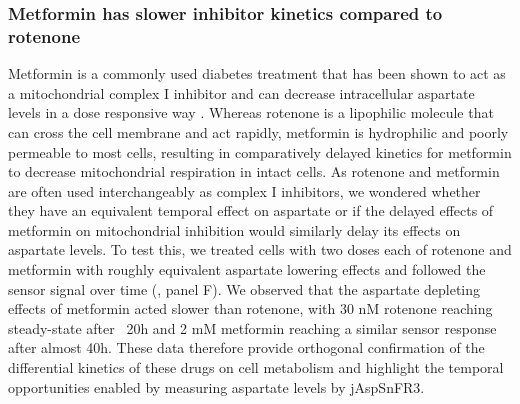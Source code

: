 \documentclass[9pt,lineno]{elife}
\begin{document}
\subsubsection{Metformin has slower inhibitor kinetics compared to rotenone}
Metformin is a commonly used diabetes treatment that has been shown to act as a mitochondrial complex I inhibitor \citep{Owen2000-ri, El-Mir2000-qm, Andrzejewski2014-wm, Wheaton2014-ka} and can decrease intracellular aspartate levels in a dose responsive way \citep{Gui2016-ca}.
Whereas rotenone is a lipophilic molecule that can cross the cell membrane and act rapidly, metformin is hydrophilic and poorly permeable to most cells, resulting in comparatively delayed kinetics for metformin to decrease mitochondrial respiration in intact cells.
As rotenone and metformin are often used interchangeably as complex I inhibitors, we wondered whether they have an equivalent temporal effect on aspartate or if the delayed effects of metformin on mitochondrial inhibition would similarly delay its effects on aspartate levels.
To test this, we treated cells with two doses each of rotenone and metformin with roughly equivalent aspartate lowering effects and followed the sensor signal over time (, panel F).
We observed that the aspartate depleting effects of metformin acted slower than rotenone, with 30 nM rotenone reaching steady-state after ~20h and 2 mM metformin reaching a similar sensor response after almost 40h.
These data therefore provide orthogonal confirmation of the differential kinetics of these drugs on cell metabolism and highlight the temporal opportunities enabled by measuring aspartate levels by jAspSnFR3.
\end{document}
